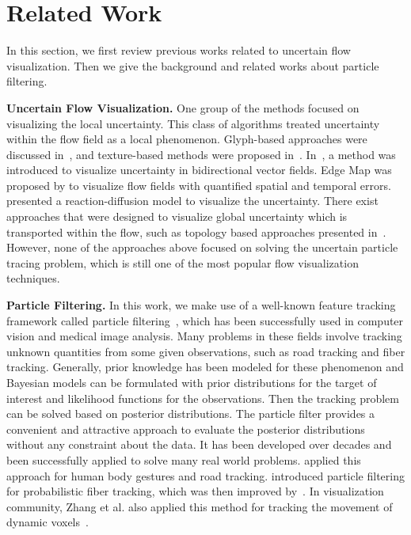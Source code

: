 \section{Related Work}

In this section, we first review previous works related to uncertain flow visualization. Then we give the background and related works about particle filtering.

\textbf{Uncertain Flow Visualization.} One group of the methods focused on visualizing the local uncertainty. This class of algorithms treated uncertainty within the flow field as a local phenomenon. Glyph-based approaches were discussed in~\cite{conf/visualization/LodhaPSW96, citeulike:4002316}, and texture-based methods were proposed in~\cite{10.1109/VIS.2005.97, botchen:2006:IVUF}. In~\cite{zuk:2008:UBVF}, a method was introduced to visualize uncertainty in bidirectional vector fields. Edge Map was proposed by \cite{10.1109/TVCG.2011.265} to visualize flow fields with quantified spatial and temporal errors. \cite{conf/visualization/SandersonJK04} presented a reaction-diffusion model to visualize the uncertainty. There exist approaches that were designed to visualize global uncertainty which is transported within the flow, such as topology based approaches presented in~\cite{Otto10a, Otto11a}. However, none of the approaches above focused on solving the uncertain particle tracing problem, which is still one of the most popular flow visualization techniques.

\textbf{Particle Filtering.} In this work, we make use of a well-known feature tracking framework called particle filtering~\cite{doucet2001sequential}, which has been successfully used in computer vision and medical image analysis. Many problems in these fields involve tracking unknown quantities from some given observations, such as road tracking and fiber tracking. Generally, prior knowledge has been modeled for these phenomenon and Bayesian models can be formulated with prior distributions for the target of interest and likelihood functions for the observations. Then the tracking problem can be solved based on posterior distributions. The particle filter provides a convenient and attractive approach to evaluate the posterior distributions without any constraint about the data. It has been developed over decades and been successfully applied to solve many real world problems. \cite{bb69534, journals/pami/GemanJ96} applied this approach for human body gestures and road tracking. \cite{bjornemoMICCAI02, Brun02whitematter} introduced particle filtering for probabilistic fiber tracking, which was then improved by~\cite{journals/mia/PontabryROSKD13, Zhang20095}. In visualization community, Zhang et al. also applied this method for tracking the movement of dynamic voxels~\cite{Zhao2012}.
